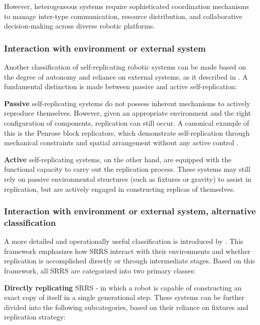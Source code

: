 However, heterogeneous systems require sophisticated coordination mechanisms 
to manage inter-type communication, resource distribution, and 
collaborative decision-making across diverse robotic platforms.


\subsubsection{Interaction with environment or external system }
Another classification of self-replicating robotic systems can be made based on 
the degree of autonomy and reliance on external systems, as it described in \cite{Lee2007Robotic}. 
A fundamental distinction is made between passive and active self-replication:

\textbf{Passive} self-replicating systems do not possess inherent mechanisms to 
actively reproduce themselves. 
However, given an appropriate environment and the right configuration 
of components, replication can still occur. 
A canonical example of this is the Penrose block replicators, 
which demonstrate self-replication through mechanical constraints 
and spatial arrangement without any active control \cite{Penrose1958Mechanics}.

\textbf{Active} self-replicating systems, on the other hand,
are equipped with the functional capacity to carry out the replication process. 
These systems may still rely on passive environmental structures 
(such as fixtures or gravity) to assist in replication, but are 
actively engaged in constructing replicas of themselves.

\subsubsection{Interaction with environment or external system, alternative classification }
A more detailed and operationally useful classification is introduced by 
\citeauthor{Suthakorn2002SpaceUtilization} \cite{Suthakorn2002SpaceUtilization}. 
This framework emphasizes how SRRS interact with their environments and 
whether replication is accomplished directly or through intermediate stages. 
Based on this framework, all SRRS are categorized into two primary classes:

\textbf{Directly replicating} SRRS - in which a robot is capable of constructing 
an exact copy of itself in a single generational step. 
These systems can be further divided into the following subcategories, 
based on their reliance on fixtures and replication strategy:


